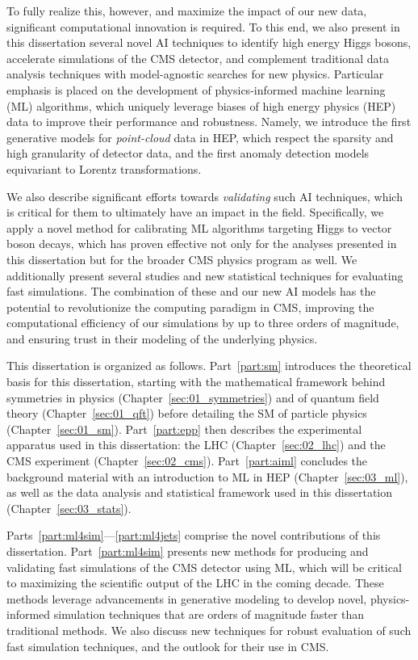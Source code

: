 To fully realize this, however, and maximize the impact of our new data, significant computational innovation is required. 
To this end, we also present in this dissertation several novel AI techniques to identify high energy Higgs bosons, accelerate simulations of the CMS detector, and complement traditional data analysis techniques with model-agnostic searches for new physics.
Particular emphasis is placed on the development of physics-informed machine learning (ML) algorithms, which uniquely leverage biases of high energy physics (HEP) data to improve their performance and robustness.
Namely, we introduce the first generative models for \textit{point-cloud} data in HEP, which respect the sparsity and high granularity of detector data, and the first anomaly detection models equivariant to Lorentz transformations.

We also describe significant efforts towards \textit{validating} such AI techniques, which is critical for them to ultimately have an impact in the field.
Specifically, we apply a novel method for calibrating ML algorithms targeting Higgs to vector boson decays, which has proven effective not only for the analyses presented in this dissertation but for the broader CMS physics program as well.
We additionally present several studies and new statistical techniques for evaluating fast simulations.
The combination of these and our new AI models has the potential to revolutionize the computing paradigm in CMS, improving the computational efficiency of our simulations by up to three orders of magnitude, and ensuring trust in their modeling of the underlying physics.


This dissertation is organized as follows.
Part~\ref{part:sm} introduces the theoretical basis for this dissertation, starting with the mathematical framework behind symmetries in physics (Chapter~\ref{sec:01_symmetries}) and of quantum field theory (Chapter~\ref{sec:01_qft}) before detailing the SM of particle physics (Chapter~\ref{sec:01_sm}).
Part~\ref{part:epp} then describes the experimental apparatus used in this dissertation: the LHC (Chapter~\ref{sec:02_lhc}) and the CMS experiment (Chapter~\ref{sec:02_cms}).
Part~\ref{part:aiml} concludes the background material with an introduction to ML in HEP (Chapter~\ref{sec:03_ml}), as well as the data analysis and statistical framework used in this dissertation (Chapter~\ref{sec:03_stats}).


Parts~\ref{part:ml4sim}---\ref{part:ml4jets} comprise the novel contributions of this dissertation.
Part~\ref{part:ml4sim} presents new methods for producing and validating fast simulations of the CMS detector using ML, which will be critical to maximizing the scientific output of the LHC in the coming decade.
These methods leverage advancements in generative modeling to develop novel, physics-informed simulation techniques that are orders of magnitude faster than traditional methods.
We also discuss new techniques for robust evaluation of such fast simulation techniques, and the outlook for their use in CMS.


